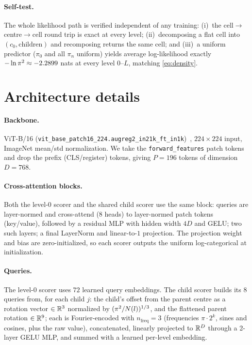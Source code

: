 \paragraph{Self-test.}
The whole likelihood path is verified independent of any training: (i)~the
cell$\rightarrow$centre$\rightarrow$cell round trip is exact at every level;
(ii)~decomposing a flat cell into $(c_0,\text{children})$ and recomposing returns
the same cell; and (iii)~a uniform predictor ($\pi_0$ and all $\pi_n$ uniform)
yields average log-likelihood exactly $-\ln\pi^2 \approx -2.2899$ nats at every
level $0$--$L$, matching \cref{eq:density}. 

\section{Architecture details}
\label{sec:supp-arch}

\paragraph{Backbone.}
ViT-B/16 (\texttt{vit\_base\_patch16\_224.\allowbreak augreg2\_in21k\_ft\_in1k})~\cite{dosovitskiy2021vit,wightman2019timm},
$224\times224$ input, ImageNet mean/std normalization. We take the
\texttt{forward\_features} patch tokens and drop the prefix (CLS/register) tokens,
giving $P{=}196$ tokens of dimension $D{=}768$.

\paragraph{Cross-attention blocks.}
Both the level-0 scorer and the shared child scorer use the same block: queries
are layer-normed and cross-attend (8 heads) to layer-normed patch tokens
(key/value), followed by a residual MLP with hidden width $4D$ and GELU; two such
layers; a final LayerNorm and linear-to-$1$ projection. The projection weight and
bias are zero-initialized, so each scorer outputs the uniform log-categorical at
initialization.

\paragraph{Queries.}
The level-0 scorer uses $72$ learned query embeddings. The child scorer builds its
$8$ queries from, for each child $j$: the child's offset from the parent centre as
a rotation vector $\in\mathbb{R}^3$ normalized by $(\pi^2/N(l))^{1/3}$, and the flattened
parent rotation $\in\mathbb{R}^9$; each is Fourier-encoded with $n_\text{freq}{=}3$
(frequencies $\pi\cdot2^k$, sines and cosines, plus the raw value), concatenated,
linearly projected to $\mathbb{R}^{D}$ through a 2-layer GELU MLP, and summed with a
learned per-level embedding.

